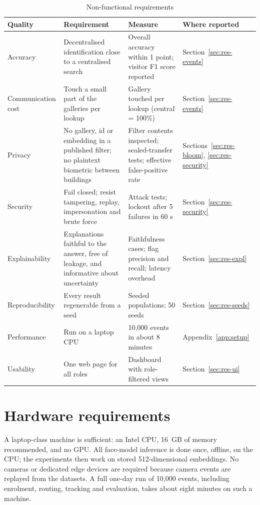 \documentclass[12pt,a4paper,oneside]{report}
\begin{document}
\begin{table}[htbp]
\centering
\caption{Non-functional requirements}\label{tab:nfr}
{\small\setlength{\tabcolsep}{4pt}\renewcommand{\arraystretch}{1.2}
\begin{tabular}{|p{2.55cm}|p{5.19cm}|p{3.40cm}|p{2.83cm}|}\hline
\textbf{Quality} & \textbf{Requirement} & \textbf{Measure} & \textbf{Where reported}\\\hline
Accuracy & Decentralised identification close to a centralised search & Overall accuracy within 1 point; visitor F1 score reported & Section~\ref{sec:res-events}\\\hline
Communication cost & Touch a small part of the galleries per lookup & Gallery touched per lookup (central = 100\%) & Section~\ref{sec:res-events}\\\hline
Privacy & No gallery, id or embedding in a published filter; no plaintext biometric between buildings & Filter contents inspected; sealed-transfer tests; effective false-positive rate & Sections~\ref{sec:res-bloom}, \ref{sec:res-security}\\\hline
Security & Fail closed; resist tampering, replay, impersonation and brute force & Attack tests; lockout after 5 failures in 60 s & Section~\ref{sec:res-security}\\\hline
Explainability & Explanations faithful to the answer, free of leakage, and informative about uncertainty & Faithfulness cases; flag precision and recall; latency overhead & Section~\ref{sec:res-expl}\\\hline
Reproducibility & Every result regenerable from a seed & Seeded populations; 50 seeds & Section~\ref{sec:res-seeds}\\\hline
Performance & Run on a laptop CPU & 10,000 events in about 8 minutes & Appendix~\ref{app:setup}\\\hline
Usability & One web page for all roles & Dashboard with role-filtered views & Section~\ref{sec:res-ui}\\\hline
\end{tabular}}
\end{table}

\section{Hardware requirements}
A laptop-class machine is sufficient: an Intel CPU, 16~GB of memory recommended, and no GPU. All face-model inference is done once, offline, on the CPU; the experiments then work on stored 512-dimensional embeddings. No cameras or dedicated edge devices are required because camera events are replayed from the datasets. A full one-day run of 10,000 events, including enrolment, routing, tracking and evaluation, takes about eight minutes on such a machine.
\end{document}
